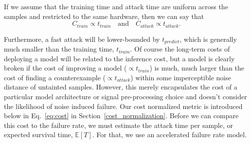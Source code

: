 If we assume that the training time and attack time are uniform across the samples and restricted to the same hardware, then we can say that
\begin{equation}
C_{train} \propto t_{train} \text{~~~and~~~} C_{attack} \propto t_{attack}.
\label{eq:naive_cost}
\end{equation}

Furthermore, a fast attack will be lower-bounded by $t_{predict}$, which is generally much smaller than the training time, $t_{train}$. Of course the long-term costs of deploying a model will be related to the inference cost, but a model is clearly broken if the cost of improving a model ($\propto t_{train}$) is much, much larger than the cost of finding a counterexample ($\propto t_{attack}$) within some imperceptible noise distance of untainted samples. However, this merely encapsulates the cost of a particular model architecture or signal pre-processing choice and doesn't consider the likelihood of noise induced failure. Our cost normalized metric is introduced below in Eq.~\ref{eq:cost} in Section~\ref{cost_normalization}. Before we can compare this cost to the failure rate, we must estimate the attack time per sample, or expected survival time, $\mathbb{E}[T]$. For that, we use an accelerated failure rate model.
